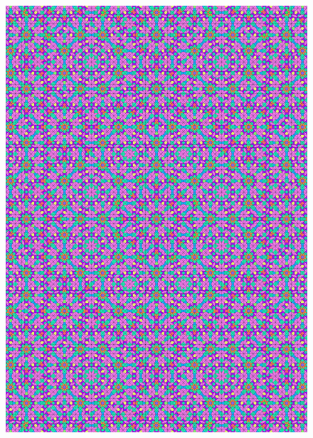 \documentclass[text.tex]{subfiles}
\begin{document}
\begin{figure}[h!]
\centering
\includegraphics[width=1\textwidth]{img/results/circle8/quasi_circle_196933_(1366_-565alpha_1).pdf}
\end{figure}
\end{document}
